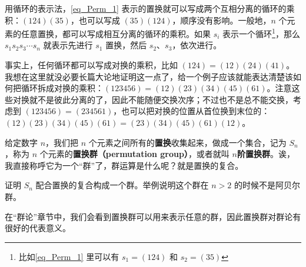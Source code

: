用循环的表示法，\autoref{eq_Perm_1}  表示的置换就可以写成两个互相分离的循环的乘积：$(1 2 4)(3 5)$，也可以写成 $(3 5 )(1 2 4)$，顺序没有影响。一般地，$n$ 个元素的任意置换，都可以写成相互分离的循环的乘积。如果 $s_i$ 表示一个循环\footnote{比如\autoref{eq_Perm_1} 里可以有 $s_1=(1 2 4)$ 和 $s_2=(3 5)$}，那么 $s_1s_2s_3\cdots s_n$ 就表示先进行 $s_1$ 置换，然后 $s_2$、$s_3$，依次进行。

事实上，任何循环都可以写成对换的乘积，比如 $(1 2 4)=(1 2)(2 4)(4 1)$。我想在这里就没必要长篇大论地证明这一点了，给一个例子应该就能表达清楚该如何把循环拆成对换的乘积：$(1 2 3 4 5 6)=(1 2)(2 3)(3 4)(4 5)(6 1)$。注意这些对换就不是彼此分离的了，因此不能随便交换次序；不过也不是总不能交换，考虑到 $(1 2 3 4 5 6)=(2 3 4 5 6 1)$，也可以把对换的位置从首位换到末位的：$(1 2)(2 3)(3 4)(4 5)(6 1)=(2 3)(3 4)(4 5)(6 1)(1 2)$。

给定数字 $n$，我们把 $n$ 个元素之间所有的\textbf{置换}收集起来，做成一个集合，记为 $S_n$，称为 $n$ 个元素的\textbf{置换群（permutation group）}，或者就叫 $n$\textbf{阶置换群}。诶，我直接称呼它为一个“群”了，群运算是什么呢？就是置换的复合。

\begin{exercise}{}
证明 $S_n$ 配合置换的复合构成一个群。举例说明这个群在 $n>2$ 的时候不是阿贝尔群。
\end{exercise}

在“群论”章节中，我们会看到置换群可以用来表示任意的群，因此置换群对群论有很好的代表意义。




